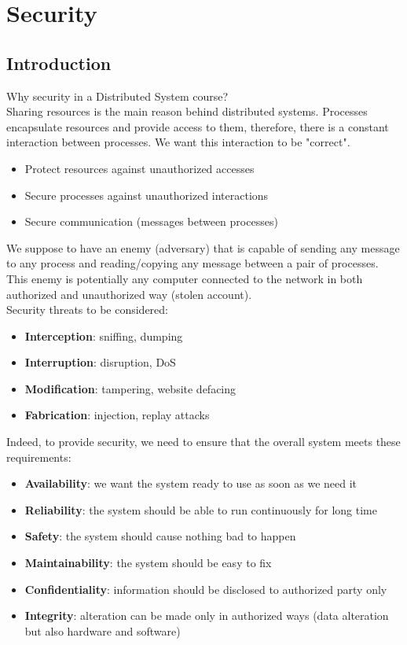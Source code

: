 \documentclass[10pt,a4paper]{article}
\begin{document}
\section{\LARGE Security}
\subsection{Introduction}
Why security in a Distributed System course? \\ Sharing resources is the main reason behind distributed systems. Processes encapsulate resources and provide access to them, therefore, there is a constant interaction between processes. We want this interaction to be "correct".
\begin{itemize}
	\item Protect resources against unauthorized accesses
	\item Secure processes against unauthorized interactions
	\item Secure communication (messages between processes)
\end{itemize}
We suppose to have an enemy (adversary) that is capable of sending any message to any process and reading/copying any message between a pair of processes. This enemy is potentially any computer connected to the network in both authorized and unauthorized way (stolen account). \\ Security threats to be considered:
\begin{itemize}
	\item \textbf{Interception}: sniffing, dumping
	\item \textbf{Interruption}: disruption, DoS
	\item \textbf{Modification}: tampering, website defacing
	\item \textbf{Fabrication}: injection, replay attacks
\end{itemize}
Indeed, to provide security, we need to ensure that the overall system meets these requirements:
\begin{itemize}
	\item \textbf{Availability}: we want the system ready to use as soon as we need it
	\item \textbf{Reliability}: the system should be able to run continuously for long time
	\item \textbf{Safety}: the system should cause nothing bad to happen
	\item \textbf{Maintainability}: the system should be easy to fix
	\item \textbf{Confidentiality}: information should be disclosed to authorized party only
	\item \textbf{Integrity}: alteration can be made only in authorized ways (data alteration but also hardware and software)
\end{itemize}
\end{document}
